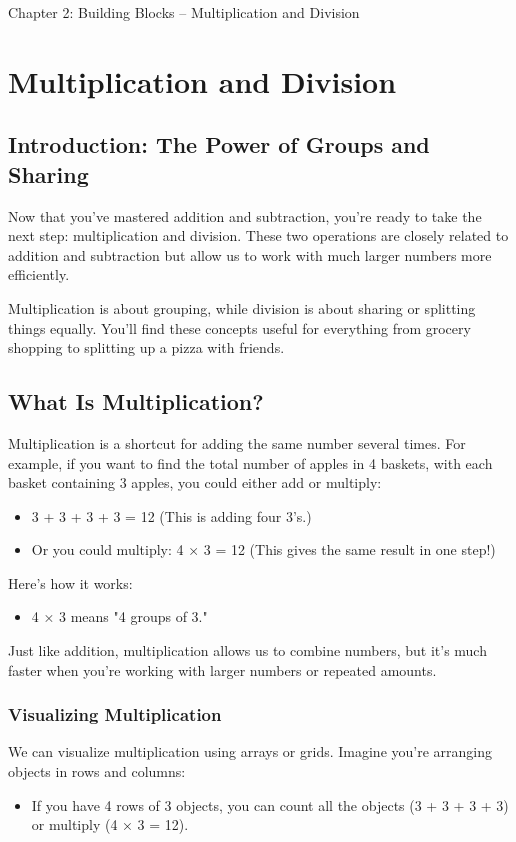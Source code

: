 Chapter 2: Building Blocks – Multiplication and Division
\chapter{Multiplication and Division}

\section{Introduction: The Power of Groups and Sharing}
Now that you’ve mastered addition and subtraction, you’re ready to take the next step: multiplication and division. These two operations are closely related to addition and subtraction but allow us to work with much larger numbers more efficiently.

Multiplication is about grouping, while division is about sharing or splitting things equally. You’ll find these concepts useful for everything from grocery shopping to splitting up a pizza with friends.

\section{What Is Multiplication?}
Multiplication is a shortcut for adding the same number several times. For example, if you want to find the total number of apples in 4 baskets, with each basket containing 3 apples, you could either add or multiply:
\begin{itemize}
    \item 3 + 3 + 3 + 3 = 12 (This is adding four 3’s.)
    \item Or you could multiply: 4 × 3 = 12 (This gives the same result in one step!)
\end{itemize}

Here’s how it works:
\begin{itemize}
    \item 4 × 3 means "4 groups of 3."
\end{itemize}

Just like addition, multiplication allows us to combine numbers, but it’s much faster when you’re working with larger numbers or repeated amounts.

\subsection{Visualizing Multiplication}
We can visualize multiplication using arrays or grids. Imagine you’re arranging objects in rows and columns:
\begin{itemize}
    \item If you have 4 rows of 3 objects, you can count all the objects (3 + 3 + 3 + 3) or multiply (4 × 3 = 12).
\end{itemize}

